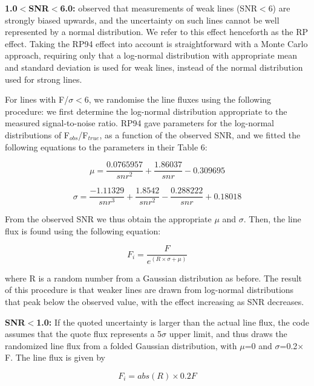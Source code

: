 \documentclass[useAMS,usenatbib]{mn2e}
\begin{document}
{\bf 1.0$<$SNR$<$6.0: } \citet[][hereafter RP94]{1994A&A...287..676R} observed that measurements of weak lines (SNR$<$6) are strongly biased upwards, and the uncertainty on such lines cannot be well represented by a normal distribution.  We refer to this effect henceforth as the RP effect.  Taking the RP94 effect into account is straightforward with a Monte Carlo approach, requiring only that a log-normal distribution with appropriate mean and standard deviation is used for weak lines, instead of the normal distribution used for strong lines.

For lines with F/$\sigma<$6, we randomise the line fluxes using the following procedure: we first determine the log-normal distribution appropriate to the measured signal-to-noise ratio.  RP94 gave parameters for the log-normal distributions of F$_{obs}$/F$_{true}$, as a function of the observed SNR, and we fitted the following equations to the parameters in their Table 6:

\begin{equation}
\mu = \frac{0.0765957}{snr^2} + \frac{1.86037}{snr} - 0.309695
\end{equation}

\begin{equation}
\sigma = \frac{-1.11329}{snr^3} + \frac{1.8542}{snr^2} - \frac{0.288222}{snr} + 0.18018
\end{equation}

From the observed SNR we thus obtain the appropriate $\mu$ and $\sigma$.  Then, the line flux is found using the following equation:

\begin{equation}
F_i = \frac{F}{e^{(R\times\sigma + \mu)}}
\end{equation}

where R is a random number from a Gaussian distribution as before.  The result of this procedure is that weaker lines are drawn from log-normal distributions that peak below the observed value, with the effect increasing as SNR decreases.

{\bf SNR$<$1.0: } If the quoted uncertainty is larger than the actual line flux, the code assumes that the quote flux represents a 5$\sigma$ upper limit, and thus draws the randomized line flux from a folded Gaussian distribution, with $\mu$=0 and $\sigma$=0.2$\times$F.  The line flux is given by

\begin{equation}
F_i = abs(R)\times0.2F
\end{equation}
\end{document}
